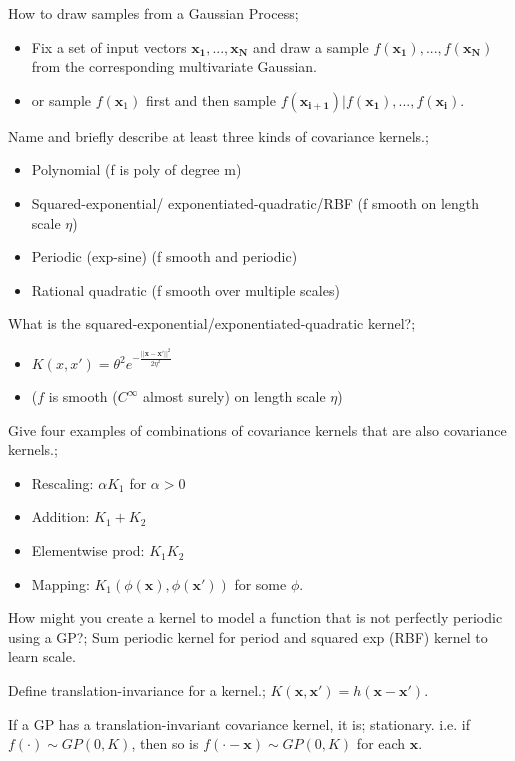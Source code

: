 \documentclass{article}
\begin{document}
How to draw samples from a Gaussian Process; \begin{itemize} \item Fix a set of input vectors $\mathbf{x_1, ..., x_N}$ and draw a sample $f(\mathbf{x_1}),...,f(\mathbf{x_N})$ from the corresponding multivariate Gaussian.  \item or sample $f(\mathbf{x}_1)$ first and then sample $f(\mathbf{x_{i+1}})|f(\mathbf{x_1}),...,f(\mathbf{x_i})$.  \end{itemize}

Name and briefly describe at least three kinds of covariance kernels.; \begin{itemize} \item Polynomial (f is poly of degree m) \item Squared-exponential/ exponentiated-quadratic/RBF (f smooth on length scale $\eta$) \item Periodic (exp-sine) (f smooth and periodic) \item Rational quadratic (f smooth over multiple scales) \end{itemize}

What is the squared-exponential/exponentiated-quadratic kernel?; \begin{itemize} \item $K(x, x')=\theta^2e^{-\frac{||\mathbf{x}-\mathbf{x'}||^2}{2\eta^2}}$ \item ($f$ is smooth ($C^\infty$ almost surely) on length scale $\eta$) \end{itemize} 

Give four examples of combinations of covariance kernels that are also covariance kernels.; \begin{itemize} \item Rescaling: $\alpha K_1$ for $\alpha > 0$ \item Addition: $K_1+K_2$ \item Elementwise prod: $K_1K_2$ \item Mapping: $K_1(\phi(\mathbf{x}), \phi(\mathbf{x'}))$ for some $\phi$.  \end{itemize}

How might you create a kernel to model a function that is not perfectly periodic using a GP?; Sum periodic kernel for period and squared exp (RBF) kernel to learn scale.

Define translation-invariance for a kernel.; $K(\mathbf{x, x'})=h(\mathbf{x-x'})$.

If a GP has a translation-invariant covariance kernel, it is; stationary. i.e. if $f(\cdot)\sim GP(0, K)$, then so is $f(\cdot - \mathbf{x})\sim GP(0, K)$ for each $\mathbf{x}$.
\end{document}
